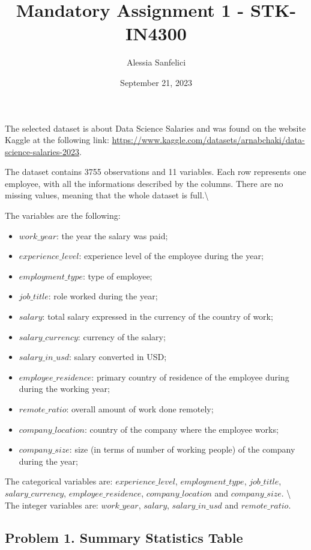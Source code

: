 \documentclass[
]{article}
\title{Mandatory Assignment 1 - STK-IN4300}
\author{Alessia Sanfelici}
\date{September 21, 2023}
\begin{document}
\maketitle

The selected dataset is about Data Science Salaries and was found on the
website Kaggle at the following link:
\url{https://www.kaggle.com/datasets/arnabchaki/data-science-salaries-2023}.

The dataset contains 3755 observations and 11 variables. Each row
represents one employee, with all the informations described by the
columns. There are no missing values, meaning that the whole dataset is
full.\textbackslash{}

The variables are the following:

\begin{itemize}
    \item $work\_year$: the year the salary was paid;
    \item $experience\_level$: experience level of the employee during the year;
    \item $employment\_type$: type of employee;
    \item $job\_title$: role worked during the year;
    \item $salary$: total salary expressed in the currency of the country of work;
    \item $salary\_currency$: currency of the salary;
    \item $salary\_in\_usd$: salary converted in USD;
    \item $employee\_residence$: primary country of residence of the employee during during the working year;
    \item $remote\_ratio$: overall amount of work done remotely; 
    \item $company\_location$: country of the company where the employee works;
    \item $company\_size$: size (in terms of number of working people) of the company during the year;
\end{itemize}

The categorical variables are: \(experience\_level\),
\(employment\_type\), \(job\_title\), \(salary\_currency\),
\(employee\_residence\), \(company\_location\) and \(company\_size\).
\textbackslash{} The integer variables are: \(work\_year\), \(salary\),
\(salary\_in\_usd\) and \(remote\_ratio\). \newline

\hypertarget{problem-1.-summary-statistics-table}{%
\subsection{Problem 1. Summary Statistics
Table}\label{problem-1.-summary-statistics-table}}
\end{document}
